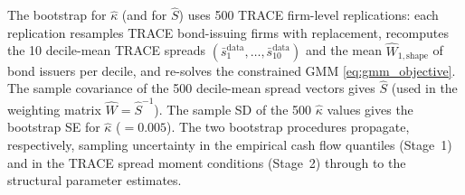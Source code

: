 The bootstrap for $\hat{\kappa}$ (and for $\hat{S}$) uses 500 TRACE firm-level replications: each replication resamples TRACE bond-issuing firms with replacement, recomputes the 10 decile-mean TRACE spreads $(\bar{s}_1^{\text{data}},\ldots,\bar{s}_{10}^{\text{data}})$ and the mean $\widehat{W}_{1,\text{shape}}$ of bond issuers per decile, and re-solves the constrained GMM \eqref{eq:gmm_objective}. The sample covariance of the 500 decile-mean spread vectors gives $\hat{S}$ (used in the weighting matrix $\hat{W} = \hat{S}^{-1}$). The sample SD of the 500 $\hat{\kappa}$ values gives the bootstrap SE for $\hat{\kappa}$ ($= 0.005$). The two bootstrap procedures propagate, respectively, sampling uncertainty in the empirical cash flow quantiles (Stage~1) and in the TRACE spread moment conditions (Stage~2) through to the structural parameter estimates.
